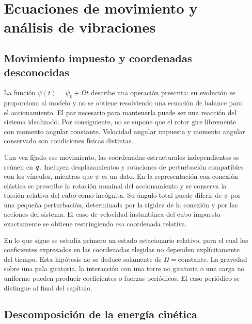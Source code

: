 \chapter{Ecuaciones de movimiento y análisis de vibraciones}
\label{ch:operacion}
\section{Movimiento impuesto y coordenadas desconocidas}
La función $\psi(t)=\psi_0+\Omega t$ describe una operación prescrita: su evolución se proporciona al modelo y no se obtiene resolviendo una ecuación de balance para el accionamiento. El par necesario para mantenerla puede ser una reacción del sistema idealizado. Por consiguiente, no se supone que el rotor gire libremente con momento angular constante. Velocidad angular impuesta y momento angular conservado son condiciones físicas distintas.

Una vez fijado ese movimiento, las coordenadas estructurales independientes se reúnen en $\bm{q}$. Incluyen desplazamientos y rotaciones de perturbación compatibles con los vínculos, mientras que $\psi$ es un dato. En la representación con conexión elástica se prescribe la rotación nominal del accionamiento y se conserva la torsión relativa del cubo como incógnita. Su ángulo total puede diferir de $\psi$ por una pequeña perturbación, determinada por la rigidez de la conexión y por las acciones del sistema. El caso de velocidad instantánea del cubo impuesta exactamente se obtiene restringiendo esa coordenada relativa.

En lo que sigue se estudia primero un estado estacionario relativo, para el cual los coeficientes expresados en las coordenadas elegidas no dependen explícitamente del tiempo. Esta hipótesis no se deduce solamente de $\Omega=\mathrm{constante}$. La gravedad sobre una pala giratoria, la interacción con una torre no giratoria o una carga no uniforme pueden producir coeficientes o fuerzas periódicos. El caso periódico se distingue al final del capítulo.

\section{Descomposición de la energía cinética}
